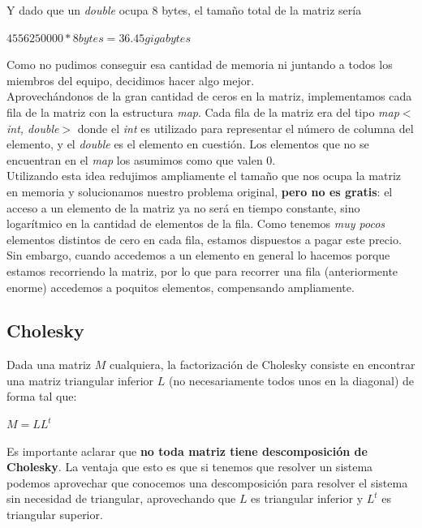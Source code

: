 Y dado que un \textit{double} ocupa 8 bytes, el tamaño total de la matriz sería
\begin{center}
    $4 556 250 000 * 8 bytes = 36.45 gigabytes$
\end{center}

Como no pudimos conseguir esa cantidad de memoria ni juntando a todos los miembros del equipo, decidimos hacer algo mejor. \\

Aprovechándonos de la gran cantidad de ceros en la matriz, implementamos cada fila de la matriz con la estructura \textit{map}. Cada fila de la matriz era del tipo \textit{map$<$int, double$>$} donde el \textit{int} es utilizado para representar el número de columna del elemento, y el \textit{double} es el elemento en cuestión. Los elementos que no se encuentran en el \textit{map} los asumimos como que valen 0. \\

Utilizando esta idea redujimos ampliamente el tamaño que nos ocupa la matriz en memoria y solucionamos nuestro problema original, \textbf{pero no es gratis}: el acceso a un elemento de la matriz ya no será en tiempo constante, sino logarítmico en la cantidad de elementos de la fila. Como tenemos \textit{muy pocos} elementos distintos de cero en cada fila, estamos dispuestos a pagar este precio. Sin embargo, cuando accedemos a un elemento en general lo hacemos porque estamos recorriendo la matriz, por lo que para recorrer una fila (anteriormente enorme) accedemos a poquitos elementos, compensando ampliamente. \\

\subsection{Cholesky}

Dada una matriz $M$ cualquiera, la factorización de Cholesky consiste en encontrar una matriz triangular inferior $L$ (no necesariamente todos unos en la diagonal) de forma tal que:
\begin{center}
$M = L L^t$
\end{center}

Es importante aclarar que \textbf{no toda matriz tiene descomposición de Cholesky}.
La ventaja que esto es que si tenemos que resolver un sistema podemos aprovechar que conocemos una descomposición para resolver el sistema sin necesidad de triangular, aprovechando que $L$ es triangular inferior y $L^t$ es triangular superior.

